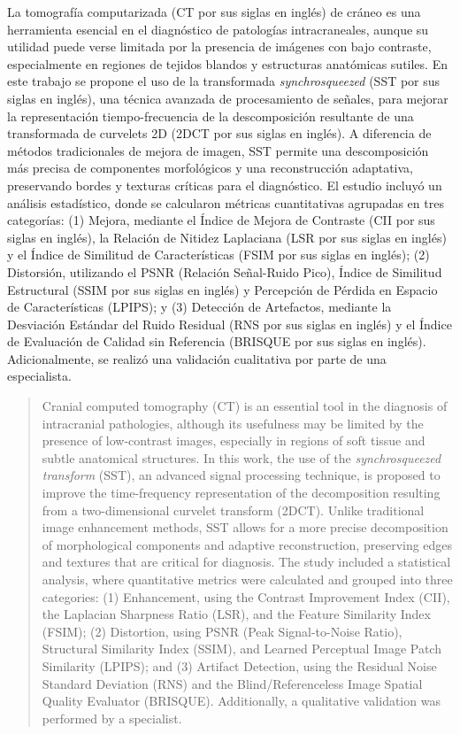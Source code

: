 \begin{resumen}
	La tomografía computarizada (CT por sus siglas en inglés) de cráneo es una herramienta esencial en el diagnóstico de patologías intracraneales, aunque su utilidad puede verse limitada por la presencia de imágenes con bajo contraste, especialmente en regiones de tejidos blandos y estructuras anatómicas sutiles. En este trabajo se propone el uso de la transformada \textit{synchrosqueezed} (SST por sus siglas en inglés), una técnica avanzada de procesamiento de señales, para mejorar la representación tiempo-frecuencia de la descomposición resultante de una transformada de curvelets 2D (2DCT por sus siglas en inglés). A diferencia de métodos tradicionales de mejora de imagen, SST permite una descomposición más precisa de componentes morfológicos y una reconstrucción adaptativa, preservando bordes y texturas críticas para el diagnóstico.  El estudio incluyó un análisis estadístico, donde se calcularon métricas cuantitativas agrupadas en tres categorías: (1) Mejora, mediante el Índice de Mejora de Contraste (CII por sus siglas en inglés), la Relación de Nitidez Laplaciana (LSR por sus siglas en inglés) y el Índice de Similitud de Características (FSIM por sus siglas en inglés); (2) Distorsión, utilizando el PSNR (Relación Señal-Ruido Pico), Índice de Similitud Estructural (SSIM por sus siglas en inglés) y Percepción de Pérdida en Espacio de Características (LPIPS); y (3) Detección de Artefactos, mediante la Desviación Estándar del Ruido Residual (RNS por sus siglas en inglés) y el Índice de Evaluación de Calidad sin Referencia (BRISQUE por sus siglas en inglés). Adicionalmente, se realizó una validación cualitativa por parte de una especialista.
\end{resumen}

\begin{abstract}
	Cranial computed tomography (CT) is an essential tool in the diagnosis of intracranial pathologies, although its usefulness may be limited by the presence of low-contrast images, especially in regions of soft tissue and subtle anatomical structures. In this work, the use of the \textit{synchrosqueezed transform} (SST), an advanced signal processing technique, is proposed to improve the time-frequency representation of the decomposition resulting from a two-dimensional curvelet transform (2DCT). Unlike traditional image enhancement methods, SST allows for a more precise decomposition of morphological components and adaptive reconstruction, preserving edges and textures that are critical for diagnosis. The study included a statistical analysis, where quantitative metrics were calculated and grouped into three categories: (1) Enhancement, using the Contrast Improvement Index (CII), the Laplacian Sharpness Ratio (LSR), and the Feature Similarity Index (FSIM); (2) Distortion, using PSNR (Peak Signal-to-Noise Ratio), Structural Similarity Index (SSIM), and Learned Perceptual Image Patch Similarity (LPIPS); and (3) Artifact Detection, using the Residual Noise Standard Deviation (RNS) and the Blind/Referenceless Image Spatial Quality Evaluator (BRISQUE). Additionally, a qualitative validation was performed by a specialist.

\end{abstract}